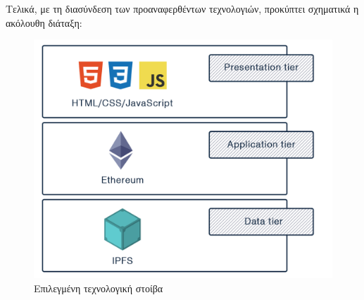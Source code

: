 \newpage
Τελικά, με τη διασύνδεση των προαναφερθέντων τεχνολογιών, προκύπτει σχηματικά η ακόλουθη διάταξη:

\begin{figure}[H]
    \centering
    \includegraphics[width=.55\textwidth]{assets/figures/chapter-3/3.2.technology.stack}
    \caption{Επιλεγμένη τεχνολογική στοίβα}
\end{figure}
